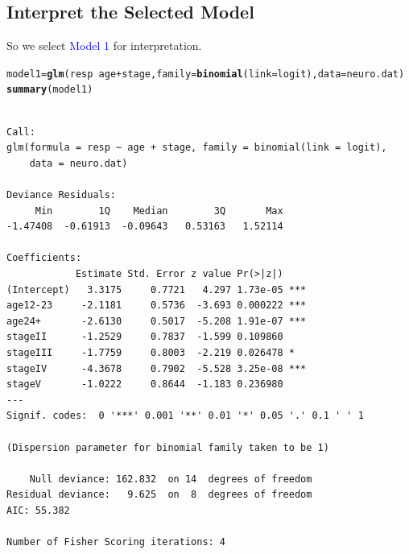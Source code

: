 \documentclass[oneside]{book}\usepackage[]{graphicx}\usepackage[svgnames]{xcolor}
\makeatletter
\newcommand{\hlopt}[1]{\textcolor[rgb]{0,0,0}{#1}}%
\newcommand{\hlstd}[1]{\textcolor[rgb]{0.345,0.345,0.345}{#1}}%
\newcommand{\hlkwb}[1]{\textcolor[rgb]{0.69,0.353,0.396}{#1}}%
\newcommand{\hlkwc}[1]{\textcolor[rgb]{0.333,0.667,0.333}{#1}}%
\newcommand{\hlkwd}[1]{\textcolor[rgb]{0.737,0.353,0.396}{\textbf{#1}}}%
\newenvironment{kframe}{%
 \def\at@end@of@kframe{}%
 \ifinner\ifhmode%
  \def\at@end@of@kframe{\end{minipage}}%
  \begin{minipage}{\columnwidth}%
 \fi\fi%
 \def\FrameCommand##1{\hskip\@totalleftmargin \hskip-\fboxsep
 \colorbox{shadecolor}{##1}\hskip-\fboxsep
     \hskip-\linewidth \hskip-\@totalleftmargin \hskip\columnwidth}%
 \MakeFramed {\advance\hsize-\width
   \@totalleftmargin\z@ \linewidth\hsize
   \@setminipage}}%
 {\par\unskip\endMakeFramed%
 \at@end@of@kframe}
\newenvironment{knitrout}{}{} %
\makeatother
\begin{document}
\subsection*{Interpret the Selected Model}
So we select \textcolor{Blue}{Model 1} for interpretation.
\begin{knitrout}
\color{fgcolor}\begin{kframe}
\begin{alltt}
\hlstd{model1} \hlkwb{=} \hlkwd{glm}\hlstd{(resp} \hlopt{~} \hlstd{age} \hlopt{+} \hlstd{stage,} \hlkwc{family} \hlstd{=} \hlkwd{binomial}\hlstd{(}\hlkwc{link} \hlstd{= logit),} \hlkwc{data} \hlstd{= neuro.dat)}
\hlkwd{summary}\hlstd{(model1)}
\end{alltt}
\begin{verbatim}

Call:
glm(formula = resp ~ age + stage, family = binomial(link = logit), 
    data = neuro.dat)

Deviance Residuals: 
     Min        1Q    Median        3Q       Max  
-1.47408  -0.61913  -0.09643   0.53163   1.52114  

Coefficients:
            Estimate Std. Error z value Pr(>|z|)    
(Intercept)   3.3175     0.7721   4.297 1.73e-05 ***
age12-23     -2.1181     0.5736  -3.693 0.000222 ***
age24+       -2.6130     0.5017  -5.208 1.91e-07 ***
stageII      -1.2529     0.7837  -1.599 0.109860    
stageIII     -1.7759     0.8003  -2.219 0.026478 *  
stageIV      -4.3678     0.7902  -5.528 3.25e-08 ***
stageV       -1.0222     0.8644  -1.183 0.236980    
---
Signif. codes:  0 '***' 0.001 '**' 0.01 '*' 0.05 '.' 0.1 ' ' 1

(Dispersion parameter for binomial family taken to be 1)

    Null deviance: 162.832  on 14  degrees of freedom
Residual deviance:   9.625  on  8  degrees of freedom
AIC: 55.382

Number of Fisher Scoring iterations: 4
\end{verbatim}
\end{kframe}
\end{knitrout}
\end{document}

